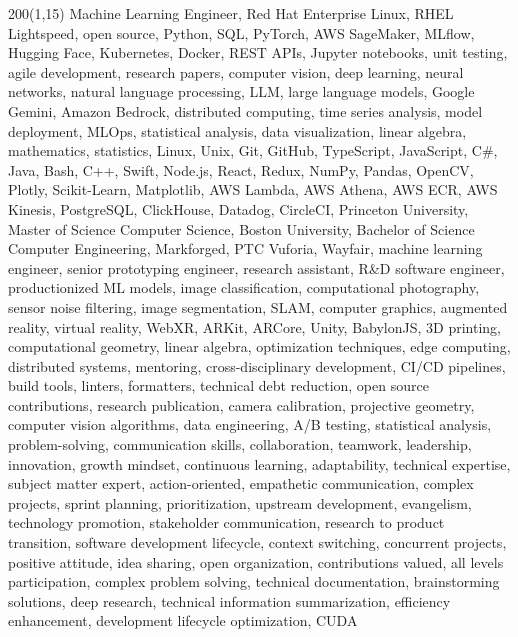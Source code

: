 \documentclass[letterpaper,10pt]{article}
\begin{document}
\begin{textblock}{200}(1,15)
  \color{white}\fontsize{1pt}{1pt}\selectfont
  Machine Learning Engineer, Red Hat Enterprise Linux, RHEL Lightspeed, open source, Python, SQL, PyTorch, AWS SageMaker, MLflow, Hugging Face, Kubernetes, Docker, REST APIs, Jupyter notebooks, unit testing, agile development, research papers, computer vision, deep learning, neural networks, natural language processing, LLM, large language models, Google Gemini, Amazon Bedrock, distributed computing, time series analysis, model deployment, MLOps, statistical analysis, data visualization, linear algebra, mathematics, statistics, Linux, Unix, Git, GitHub, TypeScript, JavaScript, C\#, Java, Bash, C++, Swift, Node.js, React, Redux, NumPy, Pandas, OpenCV, Plotly, Scikit-Learn, Matplotlib, AWS Lambda, AWS Athena, AWS ECR, AWS Kinesis, PostgreSQL, ClickHouse, Datadog, CircleCI, Princeton University, Master of Science Computer Science, Boston University, Bachelor of Science Computer Engineering, Markforged, PTC Vuforia, Wayfair, machine learning engineer, senior prototyping engineer, research assistant, R\&D software engineer, productionized ML models, image classification, computational photography, sensor noise filtering, image segmentation, SLAM, computer graphics, augmented reality, virtual reality, WebXR, ARKit, ARCore, Unity, BabylonJS, 3D printing,
  \\ computational geometry, linear algebra, optimization techniques, edge computing, distributed systems, mentoring, cross-disciplinary development, CI/CD pipelines, build tools, linters, formatters, technical debt reduction, open source contributions, research publication, camera calibration, projective geometry, computer vision algorithms, data engineering, A/B testing, statistical analysis, problem-solving, communication skills, collaboration, teamwork, leadership, innovation, growth mindset, continuous learning, adaptability, technical expertise, subject matter expert, action-oriented, empathetic communication, complex projects, sprint planning, prioritization, upstream development, evangelism, technology promotion, stakeholder communication, research to product transition, software development lifecycle, context switching, concurrent projects, positive attitude, idea sharing, open organization, contributions valued, all levels participation, complex problem solving, technical documentation, brainstorming solutions, deep research, technical information summarization, efficiency enhancement, development lifecycle optimization, CUDA
\end{textblock}

\end{document}
